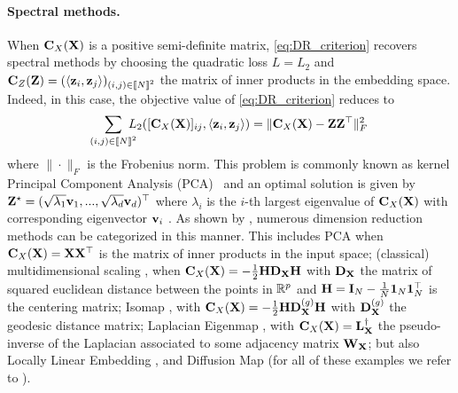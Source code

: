 \paragraph{Spectral methods.}
When ${\mathbf{C}}_{X}({\mathbf{X}})$ is a positive semi-definite matrix, \cref{eq:DR_criterion}
recovers spectral methods by choosing the quadratic loss $L = L_2$ and ${\mathbf{C}}_{Z}({\mathbf{Z}}) = (\langle {\mathbf{z}}_i, {\mathbf{z}}_j \rangle)_{(i,j) \in {[\![N]\!]}^2}$ the matrix of inner
products in the embedding space. Indeed, in this case, the objective value of \cref{eq:DR_criterion}
reduces to
\begin{equation*}
\label{eq:spectral_method}
	\sum_{(i,j) \in {[\![N]\!]}^2} \!\!\!\!\! L_2([{\mathbf{C}}_{X}({\mathbf{X}})]_{ij}, \langle {\mathbf{z}}_i, {\mathbf{z}}_j \rangle) = \| {\mathbf{C}}_{X}({\mathbf{X}}) - {\mathbf{Z}}{\mathbf{Z}}^\top \|^2_F\,
\end{equation*}
where $\|\cdot\|_F$ is the Frobenius norm. This problem is commonly known as kernel Principal Component Analysis (PCA)~\cite{scholkopf1997kernel}
 and an optimal solution is given by
${\mathbf{Z}}^\star = (\sqrt{\lambda_1} {\mathbf{v}}_{1}, ..., \sqrt{\lambda_d} {\mathbf{v}}_{d})^\top$ where $\lambda_i$ is the $i$-th
largest eigenvalue of ${\mathbf{C}}_{X}({\mathbf{X}})$ with corresponding eigenvector ${\mathbf{v}}_{i}$ 
\cite{eckart1936approximation}.  As shown by \citet{ham2004kernel, ghojogh2021unified}, numerous dimension reduction methods can be categorized in this manner.
This includes PCA when ${\mathbf{C}}_{X}({\mathbf{X}}) = {\mathbf{X}}{\mathbf{X}}^\top$ is the matrix of inner products in the input space; (classical) multidimensional scaling \cite{borg2005modern}, when ${\mathbf{C}}_{X}({\mathbf{X}}) = -\frac{1}{2} {\mathbf{H}} {\mathbf{D}}_{\mathbf{X}} {\mathbf{H}}$ with ${\mathbf{D}}_{\mathbf{X}}$ the matrix of squared euclidean distance between the points in $\mathbb{R}^{p}$ and ${\mathbf{H}} = {\mathbf{I}}_N - \frac{1}{N} \bm{1}_N \bm{1}_N^\top$ is the centering matrix; Isomap \cite{tenenbaum2000global}, with ${\mathbf{C}}_{X}({\mathbf{X}}) = -\frac{1}{2} {\mathbf{H}} {\mathbf{D}}_{\mathbf{X}}^{(g)} {\mathbf{H}}$ with ${\mathbf{D}}_{\mathbf{X}}^{(g)}$ the geodesic distance matrix; Laplacian Eigenmap
\cite{belkin2003laplacian}, with ${\mathbf{C}}_{X}({\mathbf{X}}) = {\mathbf{L}}_{\mathbf{X}}^{\dagger}$ the pseudo-inverse of the Laplacian associated to some adjacency matrix ${\mathbf{W}}_{\mathbf{X}}$; but also Locally Linear Embedding \cite{roweis2000nonlinear}, and Diffusion Map \cite{coifman2006diffusion} (for all of these examples we refer to \citealt[Table 1]{ghojogh2021unified}).

